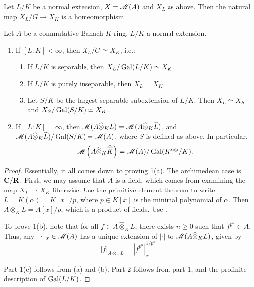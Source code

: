 \begin{theorem}
Let $L/K$ be a normal extension, $X=\operatorname{\mathscr{M}}(A)$ and $X_L$ as above. Then the 
natural map $X_L/G\to X_K$ is a homeomorphism. 
\end{theorem}

\begin{theorem}
Let $A$ be a commutative Banach $K$-ring, $L/K$ a normal extension. 
\begin{enumerate}
\item
If $[L\colon K]<\infty$, then $X_L/G\simeq X_K$, i.e.: 
\begin{enumerate}
\item
If $L/K$ is separable, then $X_L/\operatorname{Gal}(L/K)\simeq X_K$. 

\item
If $L/K$ is purely inseparable, then $X_L=X_K$. 

\item
Let $S/K$ be the largest separable subextension of $L/K$. Then 
$X_L\simeq X_S$ and $X_S/\operatorname{Gal}(S/K)\simeq X_K$. 
\end{enumerate}

\item If $[L\colon K]=\infty$, then 
$\operatorname{\mathscr{M}}(A\widehat\otimes_K L)=\operatorname{\mathscr{M}}(A\widehat\otimes_K \widehat L)$, and 
$\operatorname{\mathscr{M}}(A\widehat\otimes_K \widehat L)/\operatorname{Gal}(S/K) = \operatorname{\mathscr{M}}(A)$, where 
$S$ is defined as above. In particular, 
\[
	\operatorname{\mathscr{M}}\left(A\widehat\otimes_K \widehat{\overline K}\right) = \operatorname{\mathscr{M}}(A) / \operatorname{Gal}(K^\mathrm{sep}/K) .
\]
\end{enumerate}
\end{theorem}
\begin{proof}
Essentially, it all comes down to proving 1(a). The archimedean case is 
$\mathbf{C}/\mathbf{R}$. First, we may assume that $A$ is a field, which comes from examining 
the map $X_L\to X_K$ fiberwise. Use the primitive element theorem to write 
$L=K(\alpha)=K[x]/p$, where $p\in K[x]$ is the minimal polynomial of $\alpha$. 
Then $A\otimes_K L = A[x]/p$, which is a product of fields. Use 
\cite[1.2.3]{berkovich-1990}. 

To prove 1(b), note that for all $f\in A\widehat\otimes_K L$, there exists 
$n\geqslant 0$ such that $f^{p^n}\in A$. Thus, any $|\cdot|_x\in \operatorname{\mathscr{M}}(A)$ 
has a unique extension of $|\cdot|$ to $\operatorname{\mathscr{M}}(A\widehat\otimes_K L)$, given 
by 
\[
  |f|_{A\widehat\otimes_K L} = \left|f^{p^n}\right|_x^{1/p^n} .
\]

Part 1(c) follows from (a) and (b). Part 2 follows from part 1, and the 
profinite description of $\operatorname{Gal}(L/K)$. 
\end{proof}

